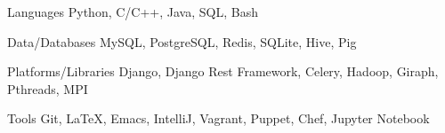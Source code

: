 

\begin{cvskills}

  \cvskill
    {Languages} %
    {Python, C/C++, Java, SQL, Bash} %

  \cvskill
    {Data/Databases} %
    {MySQL, PostgreSQL, Redis, SQLite, Hive, Pig} %

  \cvskill
    {Platforms/Libraries} %
    {Django, Django Rest Framework, Celery, Hadoop, Giraph, Pthreads, MPI}

  \cvskill
    {Tools} %
    {Git, LaTeX, Emacs, IntelliJ, Vagrant, Puppet, Chef, Jupyter Notebook} %

\end{cvskills}
